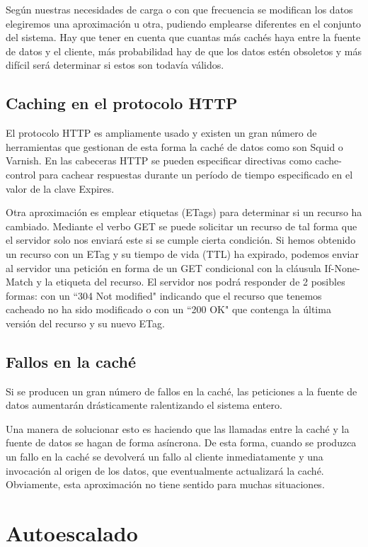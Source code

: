\documentclass[11pt,a4paper]{article}
\begin{document}
Según nuestras necesidades de carga o con que frecuencia se modifican los datos elegiremos una aproximación u otra, pudiendo emplearse diferentes en el conjunto del sistema. Hay que tener en cuenta que cuantas más cachés haya entre la fuente de datos y el cliente, más probabilidad hay de que los datos estén obsoletos y más difícil será determinar si estos son todavía válidos.

\subsection{Caching en el protocolo HTTP}

El protocolo HTTP es ampliamente usado y existen un gran número de herramientas que gestionan de esta forma la caché de datos como son Squid o Varnish. En las cabeceras HTTP se pueden especificar directivas como cache-control para cachear respuestas durante un período de tiempo especificado en el valor de la clave Expires. 

Otra aproximación es emplear etiquetas (ETags) para determinar si un recurso ha cambiado. Mediante el verbo GET se puede solicitar un recurso de tal forma que el servidor solo nos enviará este si se cumple cierta condición. Si hemos obtenido un recurso con un ETag y su tiempo de vida (TTL) ha expirado, podemos enviar al servidor una petición en forma de un GET condicional con la cláusula If-None-Match y la etiqueta del recurso. El servidor nos podrá responder de 2 posibles formas: con un ``304 Not modified" indicando que el recurso que tenemos cacheado no ha sido modificado o con un ``200 OK" que contenga la última versión del recurso y su nuevo ETag.

\subsection{Fallos en la caché}

Si se producen un gran número de fallos en la caché, las peticiones a la fuente de datos aumentarán drásticamente ralentizando el sistema entero.

Una manera de solucionar esto es haciendo que las llamadas entre la caché y la fuente de datos se hagan de forma asíncrona. De esta forma, cuando se produzca un fallo en la caché se devolverá un fallo al cliente inmediatamente y una invocación al origen de los datos, que eventualmente actualizará la caché. Obviamente, esta aproximación no tiene sentido para muchas situaciones.

\section{Autoescalado}
\end{document}
